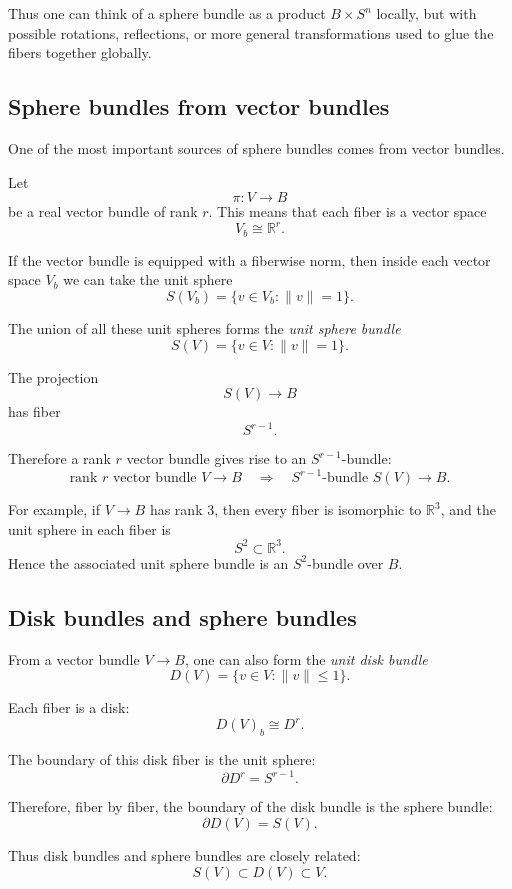 \documentclass[12pt,a4paper]{article}
\theoremstyle{notespace}
\begin{document}
Thus one can think of a sphere bundle as a product \(B\times S^n\) locally, but with possible rotations, reflections, or more general transformations used to glue the fibers together globally.

\subsection{Sphere bundles from vector bundles}

One of the most important sources of sphere bundles comes from vector bundles.

Let
\[
\pi:V\to B
\]
be a real vector bundle of rank \(r\). This means that each fiber is a vector space
\[
V_b\cong \mathbb{R}^r.
\]

If the vector bundle is equipped with a fiberwise norm, then inside each vector space \(V_b\) we can take the unit sphere
\[
S(V_b)=\{v\in V_b:\|v\|=1\}.
\]

The union of all these unit spheres forms the \emph{unit sphere bundle}
\[
S(V)=\{v\in V:\|v\|=1\}.
\]

The projection
\[
S(V)\to B
\]
has fiber
\[
S^{r-1}.
\]

Therefore a rank \(r\) vector bundle gives rise to an \(S^{r-1}\)-bundle:
\[
\boxed{
	\text{rank }r\text{ vector bundle }V\to B
	\quad\Longrightarrow\quad
	S^{r-1}\text{-bundle }S(V)\to B.
}
\]

For example, if \(V\to B\) has rank \(3\), then every fiber is isomorphic to \(\mathbb{R}^3\), and the unit sphere in each fiber is
\[
S^2\subset \mathbb{R}^3.
\]
Hence the associated unit sphere bundle is an \(S^2\)-bundle over \(B\).

\subsection{Disk bundles and sphere bundles}

From a vector bundle \(V\to B\), one can also form the \emph{unit disk bundle}
\[
D(V)=\{v\in V:\|v\|\leq 1\}.
\]

Each fiber is a disk:
\[
D(V)_b\cong D^r.
\]

The boundary of this disk fiber is the unit sphere:
\[
\partial D^r=S^{r-1}.
\]

Therefore, fiber by fiber, the boundary of the disk bundle is the sphere bundle:
\[
\boxed{
	\partial D(V)=S(V).
}
\]

Thus disk bundles and sphere bundles are closely related:
\[
S(V)\subset D(V)\subset V.
\]
\end{document}
